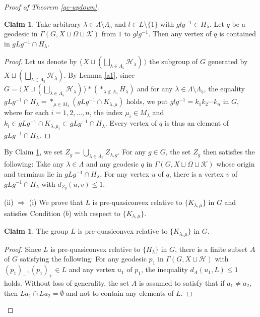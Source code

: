 \documentclass{amsart}
\theoremstyle{definition}
\newtheorem{Claim}[Thm]{Claim}
\begin{document}
\begin{proof}[Proof of Theorem \ref{qc-updown}]
\begin{Claim}\label{claim5}
Take arbitrary $\lambda\in\Lambda\setminus \Lambda_5$ and $l\in L\setminus \{1\}$ with $glg^{-1}\in H_\lambda$. 
Let $q$ be a geodesic in $\Gamma(G,X\sqcup\Omega\sqcup{\mathcal K})$ from $1$ to $glg^{-1}$. 
Then any vertex of $q$ is contained in $gLg^{-1}\cap H_\lambda$. 
\end{Claim}

\begin{proof}
Let us denote by $\langle\, X\sqcup \left(\bigsqcup_{\lambda\in\Lambda_5}{\mathcal H}_\lambda\right) \,\rangle$ the subgroup of $G$ generated by $X\sqcup \left( \bigsqcup_{\lambda\in \Lambda_5} {\mathcal H}_\lambda \right)$. 
By Lemma \ref{a1}, since $G=\langle\, X\sqcup \left(\bigsqcup_{\lambda\in\Lambda_5}{\mathcal H}_\lambda\right) \,\rangle\ast (\ast_{\lambda\notin \Lambda_5}H_\lambda)$ and for any $\lambda\in\Lambda\setminus \Lambda_5$, the equality $gLg^{-1}\cap H_\lambda=\ast_{\mu\in M_\lambda}(gLg^{-1}\cap K_{\lambda,\mu})$ holds, we put $glg^{-1}=k_1k_2\cdots k_n$ in $G$, where for each $i=1,2,\ldots,n$, the index $\mu_i\in M_\lambda$ and $k_i\in gLg^{-1}\cap K_{\lambda,\mu_i} \subset gLg^{-1}\cap H_\lambda$. 
Every vertex of $q$ is thus an element of $gLg^{-1}\cap H_\lambda$. 
\end{proof}

By Claim \ref{claim5}, we set $Z_g=\bigcup_{\lambda\in\Lambda_5}Z_{\lambda,g}$. 
For any $g\in G$, the set $Z_g$ then satisfies the following:
Take any $\lambda\in\Lambda$ and any geodesic $q$ in $\Gamma(G,X\sqcup \Omega \sqcup {\mathcal K})$ whose origin and terminus lie in $gLg^{-1} \cap H_\lambda$. 
For any vertex $u$ of $q$, there is a vertex $v$ of $gLg^{-1}\cap H_\lambda$ with $d_{Z_g}(u,v)\leq 1$. 

(ii) $\Rightarrow$ (i)
We prove that $L$ is pre-quasiconvex relative to $\{K_{\lambda,\mu}\}$ in $G$ and satisfies Condition ($b$) with respect to $\{K_{\lambda,\mu}\}$. 

\begin{Claim}\label{claim6}
The group $L$ is pre-quasiconvex relative to $\{K_{\lambda,\mu}\}$ in $G$. 
\end{Claim}

\begin{proof}
Since $L$ is pre-quasiconvex relative to $\{H_\lambda\}$ in $G$, there is a finite subset $A$ of $G$ satisfying the following: 
For any geodesic $p_1$ in $\Gamma(G,X\sqcup{\mathcal H})$ with $(p_1)_-,(p_1)_+ \in L$ and any vertex $u_1$ of $p_1$, the inequality $d_{A}(u_1,L)\leq 1$ holds. 
Without loss of generality, the set $A$ is assumed to satisfy that if $a_1\ne a_2$, then $La_1\cap La_2=\emptyset$ and not to contain any elements of $L$. 


\end{proof}
\end{proof}
\end{document}
